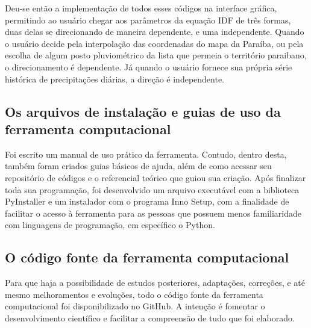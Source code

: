 Deu-se então a implementação de todos esses códigos na interface gráfica, permitindo ao usuário chegar aos parâmetros da equação IDF de três formas, duas delas se direcionando de maneira dependente, e uma independente. Quando o usuário decide pela interpolação das coordenadas do mapa da Paraíba, ou pela escolha de algum posto pluviométrico da lista que permeia o território paraibano, o direcionamento é dependente. Já quando o usuário fornece sua própria série histórica de precipitações diárias, a direção é independente. 

\subsection{Os arquivos de instalação e guias de uso da ferramenta computacional}

Foi escrito um manual de uso prático da ferramenta. Contudo, dentro desta, também foram criados guias básicos de ajuda, além de como acessar seu repositório de códigos e o referencial teórico que guiou sua criação. Após finalizar toda sua programação, foi desenvolvido um arquivo executável com a biblioteca PyInstaller e um instalador com o programa Inno Setup, com a finalidade de facilitar o acesso à ferramenta para as pessoas que possuem menos familiaridade com linguagens de programação, em específico o Python.

\subsection{O código fonte da ferramenta computacional}

Para que haja a possibilidade de estudos posteriores, adaptações, correções, e até mesmo melhoramentos e evoluções, todo o código fonte da ferramenta computacional foi disponibilizado no GitHub. A intenção é fomentar o desenvolvimento científico e facilitar a compreensão de tudo que foi elaborado.


